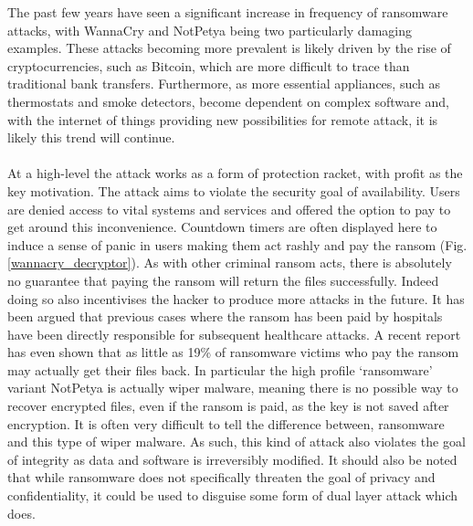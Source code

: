 \documentclass{article}
\begin{document}
The past few years have seen a significant increase in frequency of ransomware attacks\cite{doj_ransomware, symantec_istr}, with WannaCry\cite{wannacry_reuters, wannacry_bbc} and NotPetya\cite{petya_independent} being two particularly damaging examples.
These attacks becoming more prevalent is likely driven by the rise of cryptocurrencies, such as Bitcoin, which are more difficult to trace than traditional bank transfers.
Furthermore, as more essential appliances, such as thermostats and smoke detectors, become dependent on complex software and, with the internet of things providing new possibilities for remote attack, it is likely this trend will continue.
\\\\%
At a high-level the attack works as a form of protection racket, with profit as the key motivation\cite{mcafee_2018}.
The attack aims to violate the security goal of availability.
Users are denied access to vital systems and services and offered the option to pay to get around this inconvenience.
Countdown timers are often displayed here to induce a sense of panic in users making them act rashly and pay the ransom (Fig. \ref{wannacry_decryptor}).
As with other criminal ransom acts, there is absolutely no guarantee that paying the ransom will return the files successfully\cite{ncsc_mitigating_malware}. 
Indeed doing so also incentivises the hacker to produce more attacks in the future.
It has been argued that previous cases where the ransom has been paid by hospitals have been directly responsible for subsequent healthcare attacks\cite{minimizing_the_risks}.
A recent report has even shown that as little as 19\% of ransomware victims who pay the ransom may actually get their files back\cite{cyberedge_group, forbes_cyberedge}. In particular the high profile `ransomware' variant NotPetya is actually wiper malware\cite{notpetya_wiper}, meaning there is no possible way to recover encrypted files, even if the ransom is paid, as the key is not saved after encryption. It is often very difficult to tell the difference between, ransomware and this type of wiper malware. As such, this kind of attack also violates the goal of integrity as data and software is irreversibly modified.
It should also be noted that while ransomware does not specifically threaten the goal of privacy and confidentiality, it could be used to disguise some form of dual layer attack which does.
\end{document}
